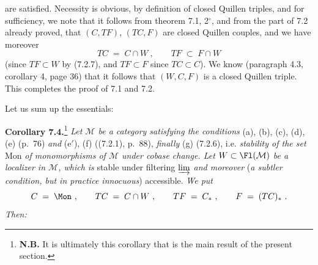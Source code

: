 are satisfied. Necessity is obvious, by definition of closed Quillen triples, and for sufficiency, we note that it follows from theorem 7.1, 2$^\circ$, and from the part of 7.2 already proved, that $(C,TF)$, $(TC,F)$ are closed Quillen couples, and we have moreover
\[
TC \;=\; C\cap W\ , \qquad TF \;\subset\; F\cap W
\]
(since $TF\subset W$ by (7.2.7), and $TF\subset F$ since $TC\subset C$). We know
(paragraph 4.3, corollary 4, page 36) that it follows that $(W,C,F)$ is a closed Quillen triple. This completes the proof of 7.1 and 7.2.

Let us sum up the essentials:

\textbf{Corollary 7.4.}\footnote[35]{\textbf{N.B.} It is ultimately this corollary that is the main result of the present section.} \textit{Let $\mathcal{M}$ be a category satisfying the conditions} (a), (b), (c), (d), (e) (p.~76) \textit{and} (e$'$), (f) ((7.2.1), p.~88), \textit{finally} (g) (7.2.6), i.e. \textit{stability of the set} Mon \textit{of monomorphisms of $\mathcal{M}$ under cobase change. Let $W\subset \Fl(\mathcal{M})$ be a localizer in $\mathcal{M}$, which is} stable under filtering $\varinjlim$ \textit{and moreover} (\textit{a subtler condition, but in practice innocuous}) accessible. \textit{We put}
\[
C \;=\; \Mon\ , \qquad TC \;=\; C\cap W\ , \qquad TF \;=\; C_*\ , \qquad F \;=\; (TC)_*\ .
\]
\textit{Then:}
